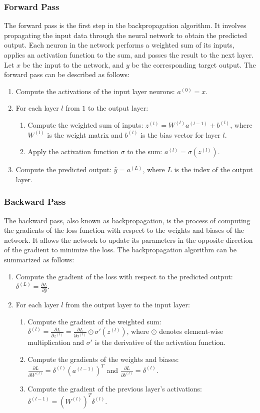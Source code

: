 \documentclass[a4paper, noexaminfo]{sapthesis}
\begin{document}
\subsubsection{Forward Pass}
The forward pass is the first step in the backpropagation algorithm. 
It involves propagating the input data through the neural network to 
obtain the predicted output. Each neuron in the network performs a 
weighted sum of its inputs, applies an activation function to the sum, 
and passes the result to the next layer.\newline
Let $x$ be the input to the network, and $y$ be the corresponding target 
output. The forward pass can be described as follows:
\begin{enumerate}
  \item Compute the activations of the input layer neurons: $a^{(0)} = x$.
  \item For each layer $l$ from $1$ to the output layer:
  \begin{enumerate}
    \item Compute the weighted sum of inputs: $z^{(l)} = W^{(l)}a^{(l-1)} + b^{(l)}$, where $W^{(l)}$ is the weight matrix and $b^{(l)}$ is the bias vector for layer $l$.
    \item Apply the activation function $\sigma$ to the sum: $a^{(l)} = \sigma(z^{(l)})$.
  \end{enumerate}
  \item Compute the predicted output: $\hat{y} = a^{(L)}$, where $L$ is the index of the output layer.
\end{enumerate}
\subsubsection{Backward Pass}
The backward pass, also known as backpropagation, is the process of 
computing the gradients of the loss function with respect to the weights
 and biases of the network. It allows the network to update its parameters 
 in the opposite direction of the gradient to minimize the loss.
The backpropagation algorithm can be summarized as follows:
\begin{enumerate}
  \item Compute the gradient of the loss with respect to the predicted output: $\delta^{(L)} = \frac{\partial L}{\partial \hat{y}}$.
  \item For each layer $l$ from the output layer to the input layer:
  \begin{enumerate}
    \item Compute the gradient of the weighted sum: $\delta^{(l)} = \frac{\partial L}{\partial z^{(l)}} = \frac{\partial L}{\partial a^{(l)}} \odot \sigma'(z^{(l)})$, where $\odot$ denotes element-wise multiplication and $\sigma'$ is the derivative of the activation function.
    \item Compute the gradients of the weights and biases: $\frac{\partial L}{\partial W^{(l)}} = \delta^{(l)} (a^{(l-1)})^T$ and $\frac{\partial L}{\partial b^{(l)}} = \delta^{(l)}$.
    \item Compute the gradient of the previous layer's activations: $\delta^{(l-1)} = (W^{(l)})^T \delta^{(l)}$.
  \end{enumerate}
\end{enumerate}
\end{document}
